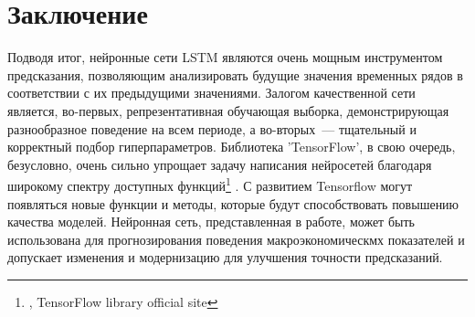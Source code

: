 \documentclass[12pt, a4paper]{article}
\begin{document}
\section{Заключение}
Подводя итог, нейронные сети LSTM являются очень мощным инструментом предсказания, позволяющим анализировать будущие значения временных рядов в соответствии с их предыдущими значениями. Залогом качественной сети является, во-первых, репрезентативная обучающая выборка, демонстрирующая разнообразное поведение на всем периоде, а во-вторых~--- тщательный и корректный подбор гиперпараметров. Библиотека 'TensorFlow', в свою очередь, безусловно, очень сильно упрощает задачу написания нейросетей благодаря широкому спектру доступных функций\footnote{\cite{TensorFlow}, TensorFlow library official site} . С развитием Tensorflow могут появляться новые функции и методы, которые будут способствовать повышению качества моделей. Нейронная сеть, представленная в работе, может быть использована для прогнозирования поведения макроэкономическмх показателей и допускает изменения и модернизацию для улучшения точности предсказаний.

\newpage
{}


\end{document}
